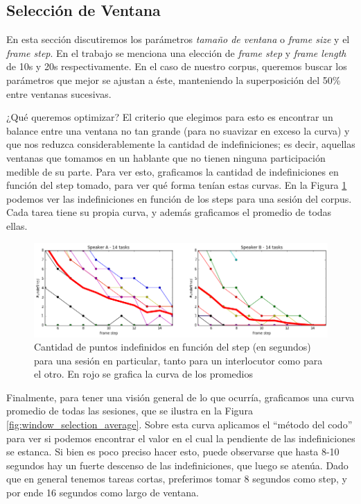 \subsection{Selección de Ventana}
\label{sec:window_selection}

En esta sección discutiremos los parámetros \emph{tamaño de ventana} o \emph{frame size} y el \emph{frame step}. En el trabajo \cite{KOU2008.2} se menciona una elección de \emph{frame step} y \emph{frame length} de 10s y 20s respectivamente. En el caso de nuestro corpus, queremos buscar los parámetros que mejor se ajustan a éste, manteniendo la superposición del 50\% entre ventanas sucesivas.

¿Qué queremos optimizar? El criterio que elegimos para esto es encontrar un balance entre una ventana no tan grande (para no suavizar en exceso la curva) y que nos reduzca considerablemente la cantidad de indefiniciones; es decir, aquellas ventanas que tomamos en un hablante que no tienen ninguna participación medible de su parte. Para ver esto, graficamos la cantidad de indefiniciones en función del step tomado, para ver qué forma tenían estas curvas. En la Figura \ref{fig:window_selection_session} podemos ver las indefiniciones en función de los steps para una sesión del corpus. Cada tarea tiene su propia curva, y además graficamos el promedio de todas ellas.

\begin{figure}
\centering
\includegraphics[width=15cm]{images/window_selection_for_session.png}
\caption{Cantidad de puntos indefinidos en función del step (en segundos) para una sesión en particular, tanto para un interlocutor como para el otro. En rojo se grafica la curva de los promedios}
\label{fig:window_selection_session}
\end{figure}

Finalmente, para tener una visión general de lo que ocurría, graficamos una curva promedio de todas las sesiones, que se ilustra en la Figura \ref{fig:window_selection_average}. Sobre esta curva aplicamos el ``método del codo'' para ver si podemos encontrar el valor en el cual la pendiente de las indefiniciones se estanca. Si bien es poco preciso hacer esto, puede observarse que hasta 8-10 segundos hay un fuerte descenso de las indefiniciones, que luego se atenúa. Dado que en general tenemos tareas cortas, preferimos tomar 8 segundos como step, y por ende 16 segundos como largo de ventana.

